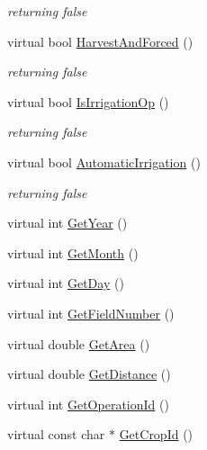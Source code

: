 \begin{DoxyCompactItemize}
\begin{DoxyCompactList}\small\item\em returning false \item\end{DoxyCompactList}\item 
virtual bool \hyperlink{classfield_operation_fields_aad34a4f52c734a152ad3768fca005b6e}{HarvestAndForced} ()
\begin{DoxyCompactList}\small\item\em returning false \item\end{DoxyCompactList}\item 
virtual bool \hyperlink{classfield_operation_fields_acc173f03d2190f694c9bef2fd1e5a314}{IsIrrigationOp} ()
\begin{DoxyCompactList}\small\item\em returning false \item\end{DoxyCompactList}\item 
virtual bool \hyperlink{classfield_operation_fields_a46acdf3a83fd93634ecc8f97d44a2f81}{AutomaticIrrigation} ()
\begin{DoxyCompactList}\small\item\em returning false \item\end{DoxyCompactList}\item 
virtual int \hyperlink{classfield_operation_fields_afbf28b06e95ccb00f99383765e080c29}{GetYear} ()
\item 
virtual int \hyperlink{classfield_operation_fields_ab99d866323e83c4c7399b59cbe6d51f3}{GetMonth} ()
\item 
virtual int \hyperlink{classfield_operation_fields_a6d75fd7b82f12f62bc14e1682c0fb978}{GetDay} ()
\item 
virtual int \hyperlink{classfield_operation_fields_a21e5e7cabdbbbecd0e7bb0adcca04740}{GetFieldNumber} ()
\item 
virtual double \hyperlink{classfield_operation_fields_a5f64c374904b49db06079a0ebc50f315}{GetArea} ()
\item 
virtual double \hyperlink{classfield_operation_fields_ad905821b48e7765eb58b13fc6fc53f57}{GetDistance} ()
\item 
virtual int \hyperlink{classfield_operation_fields_a8981c417041bf7188a41df2881b244fb}{GetOperationId} ()
\item 
virtual const char $\ast$ \hyperlink{classfield_operation_fields_a8b64bc71d98bb102539aad5e2c6aea93}{GetCropId} ()

\end{DoxyCompactItemize}
